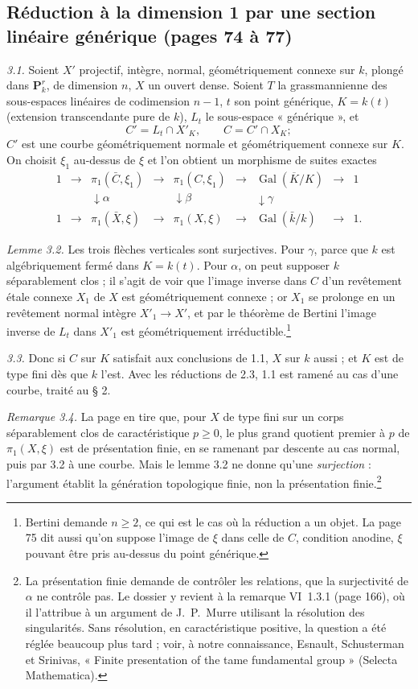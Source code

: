 \documentclass[11pt,a4paper]{article}
\begin{document}
\subsection*{Réduction à la dimension 1 par une section linéaire générique (pages 74 à 77)}

\emph{3.1.} Soient $X'$ projectif, intègre, normal, géométriquement connexe sur
$k$, plongé dans $\mathbf{P}^r_k$, de dimension $n$, $X$ un ouvert dense. Soient
$T$ la grassmannienne des sous-espaces linéaires de codimension $n-1$, $t$ son
point générique, $K = k(t)$ (extension transcendante pure de $k$), $L_t$ le
sous-espace « générique », et
\[
  C' = L_t \cap X'_K , \qquad C = C' \cap X_K ;
\]
$C'$ est une courbe géométriquement normale et géométriquement connexe sur $K$.
On choisit $\xi_1$ au-dessus de $\xi$ et l'on obtient un morphisme de suites
exactes
\[
  \begin{array}{ccccccccc}
  1 & \to & \pi_1(\bar C, \xi_1) & \to & \pi_1(C, \xi_1) & \to & \operatorname{Gal}(\overline K/K) & \to & 1 \\
  & & \downarrow{\scriptstyle\alpha} & & \downarrow{\scriptstyle\beta} & & \downarrow{\scriptstyle\gamma} & & \\
  1 & \to & \pi_1(\bar X, \xi) & \to & \pi_1(X, \xi) & \to & \operatorname{Gal}(\bar k/k) & \to & 1 .
  \end{array}
\]

\emph{Lemme 3.2.} Les trois flèches verticales sont surjectives. Pour $\gamma$,
parce que $k$ est algébriquement fermé dans $K = k(t)$. Pour $\alpha$, on peut
supposer $k$ séparablement clos ; il s'agit de voir que l'image inverse dans $C$
d'un revêtement étale connexe $X_1$ de $X$ est géométriquement connexe ; or $X_1$
se prolonge en un revêtement normal intègre $X'_1 \to X'$, et par le théorème
de Bertini l'image inverse de $L_t$ dans $X'_1$ est géométriquement
irréductible.\footnote{Bertini demande $n \geq 2$, ce qui est le cas où la
réduction a un objet. La page 75 dit aussi qu'on suppose l'image de $\xi$
dans celle de $C$, condition anodine, $\xi$ pouvant être pris au-dessus du
point générique.}

\emph{3.3.} Donc si $C$ sur $K$ satisfait aux conclusions de 1.1, $X$ sur $k$
aussi ; et $K$ est de type fini dès que $k$ l'est. Avec les réductions de 2.3,
1.1 est ramené au cas d'une courbe, traité au § 2.

\emph{Remarque 3.4.} La page en tire que, pour $X$ de type fini sur un corps
séparablement clos de caractéristique $p \geq 0$, le plus grand quotient premier
à $p$ de $\pi_1(X,\xi)$ est de présentation finie, en se ramenant par descente
au cas normal, puis par 3.2 à une courbe. Mais le lemme 3.2 ne donne qu'une
\emph{surjection} : l'argument établit la génération topologique finie, non la
présentation finie.\footnote{La présentation finie demande de contrôler les
relations, que la surjectivité de $\alpha$ ne contrôle pas. Le dossier y revient
à la remarque VI~1.3.1 (page 166), où il l'attribue à un argument de J.\ P.\
Murre utilisant la résolution des singularités. Sans résolution, en
caractéristique positive, la question a été réglée beaucoup plus tard ; voir,
à notre connaissance, Esnault, Schusterman et Srinivas, « Finite presentation of
the tame fundamental group » (Selecta Mathematica).}
\end{document}

